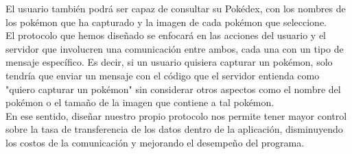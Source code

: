 \documentclass[12pt]{article}
\begin{document}
 El usuario también podrá ser capaz de consultar su Pokédex, con los nombres de los pokémon que ha capturado y la imagen de cada pokémon que seleccione. \\

 El protocolo que hemos diseñado se enfocará en las acciones del usuario y el servidor que involucren una comunicación entre ambos, cada una con un tipo de mensaje específico. Es decir, si un usuario quisiera capturar un pokémon, solo tendría que  enviar un mensaje con el código que el servidor entienda como "quiero capturar un pokémon" sin considerar otros aspectos como el nombre del pokémon o el tamaño de la imagen que contiene a tal pokémon. \\

 En ese sentido, diseñar nuestro propio protocolo nos permite tener mayor control sobre la tasa de transferencia de los datos dentro de la aplicación, disminuyendo los costos de la comunicación y mejorando el desempeño del programa.

 \newpage
\end{document}
